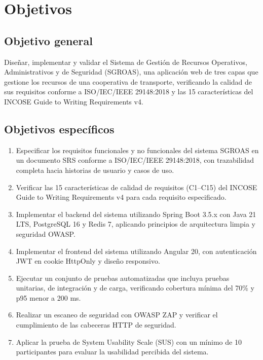 \section{Objetivos}
\label{sec:objetivos}

\subsection{Objetivo general}

Diseñar, implementar y validar el Sistema de Gestión de Recursos Operativos, Administrativos y de Seguridad (SGROAS), una aplicación web de tres capas que gestione los recursos de una cooperativa de transporte, verificando la calidad de sus requisitos conforme a ISO/IEC/IEEE 29148:2018 y las 15 características del INCOSE Guide to Writing Requirements v4.

\subsection{Objetivos específicos}

\begin{enumerate}
  \item Especificar los requisitos funcionales y no funcionales del sistema SGROAS en un documento SRS conforme a ISO/IEC/IEEE 29148:2018, con trazabilidad completa hacia historias de usuario y casos de uso.

  \item Verificar las 15 características de calidad de requisitos (C1--C15) del INCOSE Guide to Writing Requirements v4 para cada requisito especificado.

  \item Implementar el backend del sistema utilizando Spring Boot 3.5.x con Java 21 LTS, PostgreSQL 16 y Redis 7, aplicando principios de arquitectura limpia y seguridad OWASP.

  \item Implementar el frontend del sistema utilizando Angular 20, con autenticación JWT en cookie HttpOnly y diseño responsivo.

  \item Ejecutar un conjunto de pruebas automatizadas que incluya pruebas unitarias, de integración y de carga, verificando cobertura mínima del 70\% y p95 menor a 200 ms.

  \item Realizar un escaneo de seguridad con OWASP ZAP y verificar el cumplimiento de las cabeceras HTTP de seguridad.

  \item Aplicar la prueba de System Usability Scale (SUS) con un mínimo de 10 participantes para evaluar la usabilidad percibida del sistema.
\end{enumerate}

